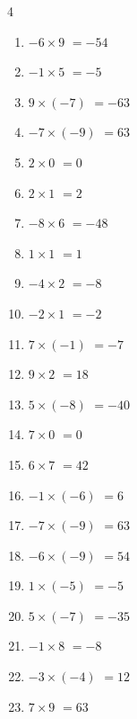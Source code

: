 \begin{multicols}{4}
\begin{enumerate}
  \item $-6\times 9$
        $=-54$

  \item $-1\times 5$
        $=-5$

  \item $9\times (-7)$
        $=-63$

  \item $-7\times (-9)$
        $=63$

  \item $2\times 0$
        $=0$

  \item $2\times 1$
        $=2$

  \item $-8\times 6$
        $=-48$

  \item $1\times 1$
        $=1$

  \item $-4\times 2$
        $=-8$

  \item $-2\times 1$
        $=-2$

  \item $7\times (-1)$
        $=-7$

  \item $9\times 2$
        $=18$

  \item $5\times (-8)$
        $=-40$

  \item $7\times 0$
        $=0$

  \item $6\times 7$
        $=42$

  \item $-1\times (-6)$
        $=6$

  \item $-7\times (-9)$
        $=63$

  \item $-6\times (-9)$
        $=54$

  \item $1\times (-5)$
        $=-5$

  \item $5\times (-7)$
        $=-35$

  \item $-1\times 8$
        $=-8$

  \item $-3\times (-4)$
        $=12$

  \item $7\times 9$
        $=63$


\end{enumerate}
\end{multicols}
